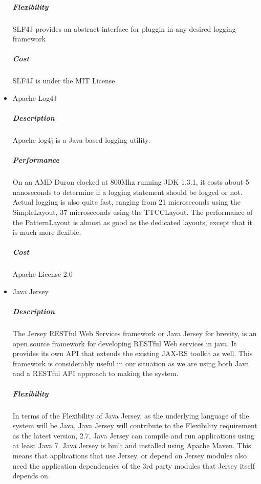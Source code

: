 \documentclass[a4paper,10pt]{article}
\begin{document}
\begin{itemize}
			\subparagraph{Flexibility}
				SLF4J provides an abstract interface for pluggin in any desired logging framework 			
			\subparagraph{Cost}
			SLF4J is under the MIT License
		\item Apache Log4J
			\subparagraph{Description}
				Apache log4j is a Java-based logging utility.
			\subparagraph{Performance}
				On an AMD Duron clocked at 800Mhz running JDK 1.3.1, it costs about 5 nanoseconds to determine if a logging statement should be logged or not. Actual logging is also quite fast, ranging from 21 microseconds using the SimpleLayout, 37 microseconds using the TTCCLayout. The performance of the PatternLayout is almost as good as the dedicated layouts, except that it is much more flexible.
			\subparagraph{Cost}
				Apache License 2.0
		\item Java Jersey
			\subparagraph{Description}
			The Jersey RESTful Web Services framework or Java Jersey for brevity, is an open source framework for developing RESTful Web services in java. It provides its own API that extends the existing JAX-RS toolkit as well. This framework is considerably useful in our situation as we are using both Java and a RESTful API approach to making the system.
			\subparagraph{Flexibility}
			In terms of the Flexibility of Java Jersey, as the underlying language of the system will be Java, Java Jersey will contribute to the Flexibility requirement as the latest version, 2.7, Java Jersey can compile and run applications using at least Java 7. Java Jersey is built and installed using Apache Maven. This means that applications that use Jersey, or depend on Jersey modules also need the application dependencies of the 3rd party modules that Jersey itself depends on.


\end{itemize}
\end{document}
